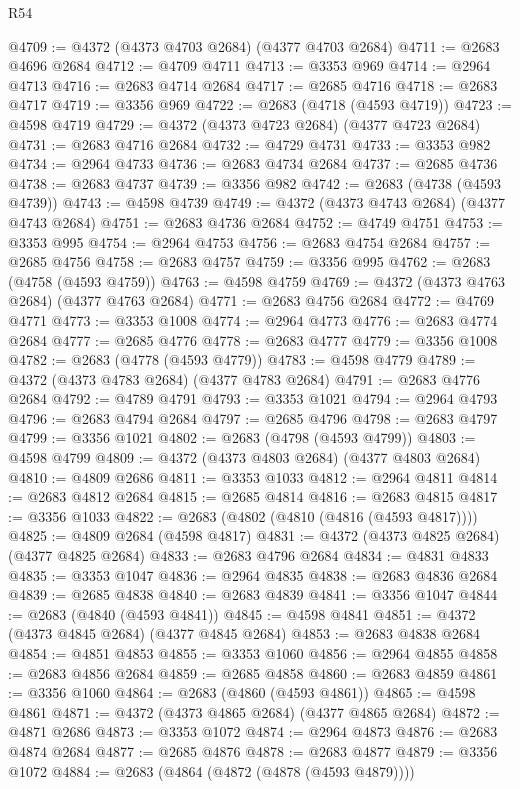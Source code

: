 \begin{lexlean}{R54}
\begin{coremodule}
@4709 := @4372 (@4373 @4703 @2684) (@4377 @4703 @2684)
@4711 := @2683 @4696 @2684
@4712 := @4709 @4711
@4713 := @3353 @969
@4714 := @2964 @4713
@4716 := @2683 @4714 @2684
@4717 := @2685 @4716
@4718 := @2683 @4717
@4719 := @3356 @969
@4722 := @2683 (@4718 (@4593 @4719))
@4723 := @4598 @4719
@4729 := @4372 (@4373 @4723 @2684) (@4377 @4723 @2684)
@4731 := @2683 @4716 @2684
@4732 := @4729 @4731
@4733 := @3353 @982
@4734 := @2964 @4733
@4736 := @2683 @4734 @2684
@4737 := @2685 @4736
@4738 := @2683 @4737
@4739 := @3356 @982
@4742 := @2683 (@4738 (@4593 @4739))
@4743 := @4598 @4739
@4749 := @4372 (@4373 @4743 @2684) (@4377 @4743 @2684)
@4751 := @2683 @4736 @2684
@4752 := @4749 @4751
@4753 := @3353 @995
@4754 := @2964 @4753
@4756 := @2683 @4754 @2684
@4757 := @2685 @4756
@4758 := @2683 @4757
@4759 := @3356 @995
@4762 := @2683 (@4758 (@4593 @4759))
@4763 := @4598 @4759
@4769 := @4372 (@4373 @4763 @2684) (@4377 @4763 @2684)
@4771 := @2683 @4756 @2684
@4772 := @4769 @4771
@4773 := @3353 @1008
@4774 := @2964 @4773
@4776 := @2683 @4774 @2684
@4777 := @2685 @4776
@4778 := @2683 @4777
@4779 := @3356 @1008
@4782 := @2683 (@4778 (@4593 @4779))
@4783 := @4598 @4779
@4789 := @4372 (@4373 @4783 @2684) (@4377 @4783 @2684)
@4791 := @2683 @4776 @2684
@4792 := @4789 @4791
@4793 := @3353 @1021
@4794 := @2964 @4793
@4796 := @2683 @4794 @2684
@4797 := @2685 @4796
@4798 := @2683 @4797
@4799 := @3356 @1021
@4802 := @2683 (@4798 (@4593 @4799))
@4803 := @4598 @4799
@4809 := @4372 (@4373 @4803 @2684) (@4377 @4803 @2684)
@4810 := @4809 @2686
@4811 := @3353 @1033
@4812 := @2964 @4811
@4814 := @2683 @4812 @2684
@4815 := @2685 @4814
@4816 := @2683 @4815
@4817 := @3356 @1033
@4822 := @2683 (@4802 (@4810 (@4816 (@4593 @4817))))
@4825 := @4809 @2684 (@4598 @4817)
@4831 := @4372 (@4373 @4825 @2684) (@4377 @4825 @2684)
@4833 := @2683 @4796 @2684
@4834 := @4831 @4833
@4835 := @3353 @1047
@4836 := @2964 @4835
@4838 := @2683 @4836 @2684
@4839 := @2685 @4838
@4840 := @2683 @4839
@4841 := @3356 @1047
@4844 := @2683 (@4840 (@4593 @4841))
@4845 := @4598 @4841
@4851 := @4372 (@4373 @4845 @2684) (@4377 @4845 @2684)
@4853 := @2683 @4838 @2684
@4854 := @4851 @4853
@4855 := @3353 @1060
@4856 := @2964 @4855
@4858 := @2683 @4856 @2684
@4859 := @2685 @4858
@4860 := @2683 @4859
@4861 := @3356 @1060
@4864 := @2683 (@4860 (@4593 @4861))
@4865 := @4598 @4861
@4871 := @4372 (@4373 @4865 @2684) (@4377 @4865 @2684)
@4872 := @4871 @2686
@4873 := @3353 @1072
@4874 := @2964 @4873
@4876 := @2683 @4874 @2684
@4877 := @2685 @4876
@4878 := @2683 @4877
@4879 := @3356 @1072
@4884 := @2683 (@4864 (@4872 (@4878 (@4593 @4879))))

\end{coremodule}
\end{lexlean}
